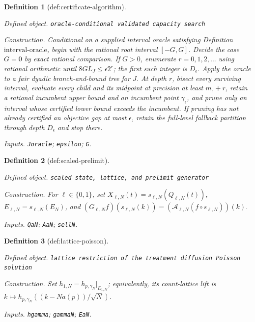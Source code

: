 \documentclass{article}
\newtheorem{definition}{Definition}
\begin{document}
\begin{definition}[def:certificate-algorithm]\label{def:certificate-algorithm}
\par\smallskip\noindent\emph{Defined object.} \texttt{oracle-\allowbreak{}conditional validated capacity search}
\par\smallskip\noindent\emph{Construction.} Conditional on a supplied interval oracle satisfying Definition \(\mathrm{interval\mbox{-}oracle}\), begin with the rational root interval \([-G,G]\).  Decide the case \(G=0\) by exact rational comparison.  If \(G>0\), enumerate \(r=0,1,2,\ldots\) using rational arithmetic until \(8GL_J\leq\epsilon2^r\); the first such integer is \(D_\epsilon\).  Apply the oracle to a fair dyadic branch-and-bound tree for \(J\).  At depth \(r\), bisect every surviving interval, evaluate every child and its midpoint at precision at least \(m_\epsilon+r\), retain a rational incumbent upper bound and an incumbent point \(\gamma_\epsilon\), and prune only an interval whose certified lower bound exceeds the incumbent.  If pruning has not already certified an objective gap at most \(\epsilon\), retain the full-level fallback partition through depth \(D_\epsilon\) and stop there.
\par\smallskip\noindent\emph{Inputs.} \texttt{Joracle}; \texttt{epsilon}; \texttt{G}.
\end{definition}

\begin{definition}[def:scaled-prelimit]\label{def:scaled-prelimit}
\par\smallskip\noindent\emph{Defined object.} \texttt{scaled state,\allowbreak{} lattice,\allowbreak{} and prelimit generator}
\par\smallskip\noindent\emph{Construction.} For \(\ell\in\{0,1\}\), set \(X_{\ell,N}(t)=s_{\ell,N}(Q_{\ell,N}(t))\), \(E_{\ell,N}=s_{\ell,N}(E_N)\), and \((G_{\ell,N}f)(s_{\ell,N}(k))=(\mathcal A_{\ell,N}(f\circ s_{\ell,N}))(k)\).
\par\smallskip\noindent\emph{Inputs.} \texttt{QaN}; \texttt{AaN}; \texttt{sellN}.
\end{definition}

\begin{definition}[def:lattice-poisson]\label{def:lattice-poisson}
\par\smallskip\noindent\emph{Defined object.} \texttt{lattice restriction of the treatment diffusion Poisson solution}
\par\smallskip\noindent\emph{Construction.} Set \(h_{1,N}=h_{p,\gamma_N}|_{E_{1,N}}\); equivalently, its count-lattice lift is \(k\mapsto h_{p,\gamma_N}((k-Na(p))/\sqrt N)\).
\par\smallskip\noindent\emph{Inputs.} \texttt{hgamma}; \texttt{gammaN}; \texttt{EaN}.
\end{definition}
\end{document}
